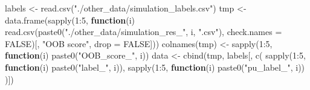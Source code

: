 \documentclass[
  11pt,
  oneside]{book}
\newenvironment{Shaded}{\begin{snugshade}}{\end{snugshade}}
\newcommand{\AttributeTok}[1]{\textcolor[rgb]{0.77,0.63,0.00}{#1}}
\newcommand{\ConstantTok}[1]{\textcolor[rgb]{0.00,0.00,0.00}{#1}}
\newcommand{\ControlFlowTok}[1]{\textcolor[rgb]{0.13,0.29,0.53}{\textbf{#1}}}
\newcommand{\DecValTok}[1]{\textcolor[rgb]{0.00,0.00,0.81}{#1}}
\newcommand{\FunctionTok}[1]{\textcolor[rgb]{0.00,0.00,0.00}{#1}}
\newcommand{\NormalTok}[1]{#1}
\newcommand{\OtherTok}[1]{\textcolor[rgb]{0.56,0.35,0.01}{#1}}
\newcommand{\SpecialCharTok}[1]{\textcolor[rgb]{0.00,0.00,0.00}{#1}}
\newcommand{\StringTok}[1]{\textcolor[rgb]{0.31,0.60,0.02}{#1}}
\begin{document}
\begin{Shaded}
\begin{Highlighting}[]
\NormalTok{labels }\OtherTok{\textless{}{-}} \FunctionTok{read.csv}\NormalTok{(}\StringTok{"./other\_data/simulation\_labels.csv"}\NormalTok{)}
\NormalTok{tmp }\OtherTok{\textless{}{-}} \FunctionTok{data.frame}\NormalTok{(}\FunctionTok{sapply}\NormalTok{(}\DecValTok{1}\SpecialCharTok{:}\DecValTok{5}\NormalTok{, }\ControlFlowTok{function}\NormalTok{(i) }\FunctionTok{read.csv}\NormalTok{(}\FunctionTok{paste0}\NormalTok{(}\StringTok{"./other\_data/simulation\_res\_"}\NormalTok{, i, }\StringTok{".csv"}\NormalTok{), }\AttributeTok{check.names =} \ConstantTok{FALSE}\NormalTok{)[, }\StringTok{"OOB score"}\NormalTok{, }\AttributeTok{drop =} \ConstantTok{FALSE}\NormalTok{]))}
\FunctionTok{colnames}\NormalTok{(tmp) }\OtherTok{\textless{}{-}} \FunctionTok{sapply}\NormalTok{(}\DecValTok{1}\SpecialCharTok{:}\DecValTok{5}\NormalTok{, }\ControlFlowTok{function}\NormalTok{(i) }\FunctionTok{paste0}\NormalTok{(}\StringTok{"OOB\_score\_"}\NormalTok{, i))}
\NormalTok{data }\OtherTok{\textless{}{-}} \FunctionTok{cbind}\NormalTok{(tmp, labels[, }\FunctionTok{c}\NormalTok{(}
  \FunctionTok{sapply}\NormalTok{(}\DecValTok{1}\SpecialCharTok{:}\DecValTok{5}\NormalTok{, }\ControlFlowTok{function}\NormalTok{(i) }\FunctionTok{paste0}\NormalTok{(}\StringTok{"label\_"}\NormalTok{, i)),}
  \FunctionTok{sapply}\NormalTok{(}\DecValTok{1}\SpecialCharTok{:}\DecValTok{5}\NormalTok{, }\ControlFlowTok{function}\NormalTok{(i) }\FunctionTok{paste0}\NormalTok{(}\StringTok{"pu\_label\_"}\NormalTok{, i))}
\NormalTok{)])}
\end{Highlighting}
\end{Shaded}
\end{document}

